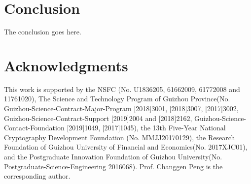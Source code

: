 \documentclass[journal]{IEEEtran}
\begin{document}
\section{Conclusion}
The conclusion goes here.


\section*{Acknowledgments}
This work is supported by the NSFC (No. U1836205, 61662009, 61772008 and 11761020), The Science and Technology Program of Guizhou Province(No. Guizhou-Science-Contract-Major-Program [2018]3001, [2018]3007, [2017]3002,  Guizhou-Science-Contract-Support [2019]2004 and [2018]2162, Guizhou-Science-Contact-Foundation [2019]1049, [2017]1045), the 13th Five-Year National Cryptography Development Foundation (No. MMJJ20170129), the Research Foundation of Guizhou University of Financial and Economics(No. 2017XJC01), and the Postgraduate Innovation Foundation of Guizhou University(No. Postgraduate-Science-Engineering 2016068). Prof. Changgen Peng is the corresponding author.


%
\end{document}
